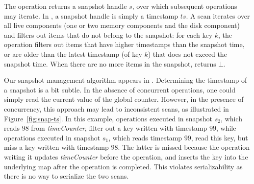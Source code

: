 The  operation returns a snapshot handle $s$, over which
subsequent operations may iterate.
In \clsm, a snapshot handle is simply a timestamp $ts$.
A scan iterates over all live components (one or two
memory components and the disk component) and filters out items that do not
belong to the snapshot:
for each key $k$, the  operation filters out items that have higher
timestamps than the snapshot time, or are older than the latest timestamp (of key $k$) that does not exceed the snapshot time.
When there are no more items in the snapshot,  returns $\bot$.

Our snapshot management algorithm appears in .
Determining the timestamp of a snapshot is a bit subtle.
In the absence of concurrent operations, one could simply read the current value
of the global counter.
%
However, in the presence of concurrency, this approach may lead to
inconsistent scans, as illustrated in Figure~\ref{fig:snap-ts}. In this
example,  operations executed in snapshot $s_2$, which reads
$98$ from \emph{timeCounter}, filter out a key written with timestamp
$99$, while  operations executed in snapshot $s_1$, which reads timestamp
$99$, read this key, but miss a key written with timestamp $98$. The latter is missed because the
 operation writing it updates \emph{timeCounter} before the
 operation, and inserts the key into the underlying map after the
 operation is completed.
This violates serializability as there is no way to serialize the two scans.

